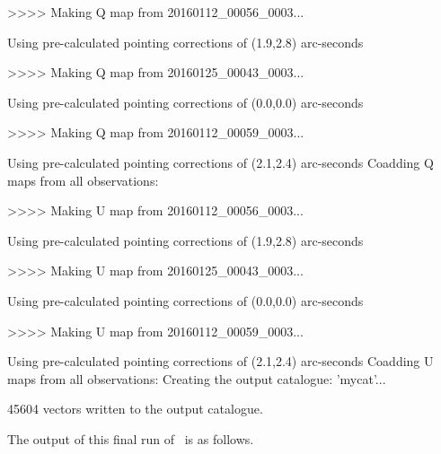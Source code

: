 \begin{terminalv}
>>>>   Making Q map from 20160112_00056_0003...

   Using pre-calculated pointing corrections of (1.9,2.8) arc-seconds

>>>>   Making Q map from 20160125_00043_0003...

   Using pre-calculated pointing corrections of (0.0,0.0) arc-seconds

>>>>   Making Q map from 20160112_00059_0003...

   Using pre-calculated pointing corrections of (2.1,2.4) arc-seconds
Coadding Q maps from all observations:

>>>>   Making U map from 20160112_00056_0003...

   Using pre-calculated pointing corrections of (1.9,2.8) arc-seconds

>>>>   Making U map from 20160125_00043_0003...

   Using pre-calculated pointing corrections of (0.0,0.0) arc-seconds

>>>>   Making U map from 20160112_00059_0003...

   Using pre-calculated pointing corrections of (2.1,2.4) arc-seconds
Coadding U maps from all observations:
Creating the output catalogue: 'mycat'...

45604 vectors written to the output catalogue.
\end{terminalv}


The output of this final run of \poltwomap\ is as follows.

